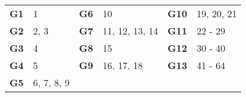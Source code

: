 \begin{tabular}{|r|l||r|l||r|l|}

\hline

\textbf{G1} & 1 & \textbf{G6} & 10 & \textbf{G10} & 19, 20, 21 \\
\textbf{G2} & 2, 3 & \textbf{G7} & 11, 12, 13, 14 & \textbf{G11} & 22 - 29 \\
\textbf{G3} & 4 & \textbf{G8} & 15 & \textbf{G12} & 30 - 40 \\
\textbf{G4} & 5 & \textbf{G9} & 16, 17, 18 & \textbf{G13} & 41 - 64 \\
\textbf{G5} & 6, 7, 8, 9 & & & & \\

\hline

\end{tabular}
